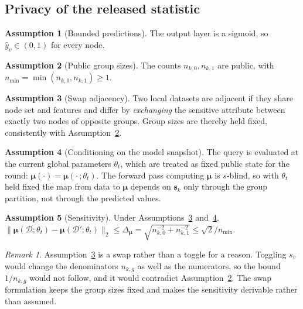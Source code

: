 \documentclass[preprint,12pt]{elsarticle}
\theoremstyle{plain}
\theoremstyle{definition}
\newtheorem{assumption}{Assumption}
\theoremstyle{remark}
\newtheorem{remark}{Remark}
\begin{document}
\subsection{Privacy of the released statistic}

\begin{assumption}[Bounded predictions]\label{ass:bounded}
The output layer is a sigmoid, so $\hat{y}_v \in (0,1)$ for every node.
\end{assumption}

\begin{assumption}[Public group sizes]\label{ass:counts}
The counts $n_{k,0},n_{k,1}$ are public, with $n_{\min} = \min(n_{k,0},n_{k,1}) \ge 1$.
\end{assumption}

\begin{assumption}[Swap adjacency]\label{ass:adjacency}
Two local datasets are adjacent if they share node set and features and differ by \emph{exchanging} the sensitive attribute between exactly two nodes of opposite groups. Group sizes are thereby held fixed, consistently with Assumption~\ref{ass:counts}.
\end{assumption}

\begin{assumption}[Conditioning on the model snapshot]\label{ass:snapshot}
The query is evaluated at the current global parameters $\theta_t$, which are treated as fixed public state for the round: $\bm{\mu}(\cdot) = \bm{\mu}(\cdot\,;\theta_t)$. The forward pass computing $\bm{\mu}$ is $s$-blind, so with $\theta_t$ held fixed the map from data to $\bm{\mu}$ depends on $\bm{s}_k$ only through the group partition, not through the predicted values.
\end{assumption}

\begin{assumption}[Sensitivity]\label{ass:sensitivity}
Under Assumptions~\ref{ass:adjacency} and~\ref{ass:snapshot}, $\lVert\bm{\mu}(\mathcal{D};\theta_t) - \bm{\mu}(\mathcal{D}';\theta_t)\rVert_2 \le \Delta_{\bm{\mu}} = \sqrt{n_{k,0}^{-2} + n_{k,1}^{-2}} \le \sqrt{2}/n_{\min}$.
\end{assumption}

\begin{remark}
Assumption~\ref{ass:adjacency} is a swap rather than a toggle for a reason. Toggling $s_v$ would change the denominators $n_{k,g}$ as well as the numerators, so the bound $1/n_{k,g}$ would not follow, and it would contradict Assumption~\ref{ass:counts}. The swap formulation keeps the group sizes fixed and makes the sensitivity derivable rather than assumed.
\end{remark}
\end{document}
